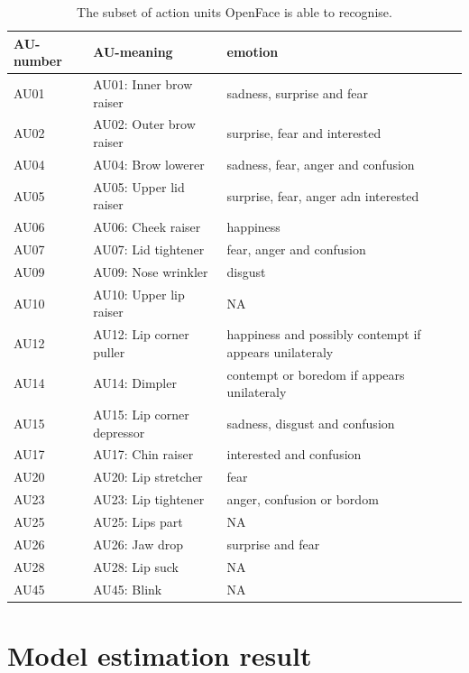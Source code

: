 \documentclass{monashthesis}
\begin{document}
\begin{table}[ht]
\begin{center}
\caption{\label{tab:au} The subset of action units OpenFace is able to recognise.}
\begin{tabular}{lll}
\toprule
AU-number & AU-meaning & emotion \\
\midrule
AU01 & AU01: Inner brow raiser & sadness, surprise and fear \\
AU02 & AU02: Outer brow raiser & surprise, fear and interested \\
AU04 & AU04: Brow lowerer & sadness, fear, anger and confusion \\
AU05 & AU05: Upper lid raiser & surprise, fear, anger adn interested \\
AU06 & AU06: Cheek raiser & happiness \\
AU07 & AU07: Lid tightener & fear, anger and confusion \\
AU09 & AU09: Nose wrinkler & disgust \\
AU10 & AU10: Upper lip raiser & NA \\
AU12 & AU12: Lip corner puller & happiness and possibly contempt if appears unilateraly \\
AU14 & AU14: Dimpler & contempt or boredom if appears unilateraly \\
AU15 & AU15: Lip corner depressor & sadness, disgust and confusion \\
AU17 & AU17: Chin raiser & interested and confusion \\
AU20 & AU20: Lip stretcher & fear \\
AU23 & AU23: Lip tightener & anger, confusion or bordom \\
AU25 & AU25: Lips part & NA \\
AU26 & AU26: Jaw drop & surprise and fear \\
AU28 & AU28: Lip suck & NA \\
AU45 & AU45: Blink & NA \\
\bottomrule
\end{tabular}
\end{center}
\end{table}

\hypertarget{model-estimation-result}{%
\section{Model estimation result}\label{model-estimation-result}}
\end{document}
